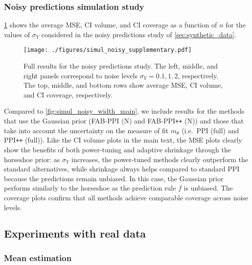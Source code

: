 \subsubsection{Noisy predictions simulation study}\label{app:simul_noisy_supplementary}
\cref{fig:simul_noisy_supplementary} shows the average MSE, CI volume, and CI coverage as a function of $n$ for the values of $\sigma_Y$ considered in the noisy predictions study of \cref{sec:synthetic_data}.
\begin{figure}[ht!]
    \centering
    \texttt{[image: ./figures/simul\_noisy\_supplementary.pdf]}
    \caption{Full results for the noisy predictions study. The left, middle, and right panels correspond to noise levels $\sigma_Y = 0.1, 1, 2$, respectively. The top, middle, and bottom rows show average MSE, CI volume, and CI coverage, respectively.}
    \label{fig:simul_noisy_supplementary}
\end{figure}
Compared to \cref{fig:simul_noisy_width_main}, we include results for the methods that use the Gaussian prior (FAB-PPI (N) and FAB-PPI\texttt{++} (N)) and those that take into account the uncertainty on the measure of fit $m_\theta$ (i.e.~PPI (full) and PPI\texttt{++} (full)). Like the CI volume plots in the main text, the MSE plots clearly show the benefits of both power-tuning and adaptive shrinkage through the horseshoe prior: as $\sigma_Y$ increases, the power-tuned methods clearly outperform the standard alternatives, while shrinkage always helps compared to standard PPI because the predictions remain unbiased. In this case, the Gaussian prior performs similarly to the horseshoe as the prediction rule $f$ is unbiased. The coverage plots confirm that all methods achieve comparable coverage across noise levels.

\subsection{Experiments with real data}\label{app:real_supplementary}
\subsubsection{Mean estimation}\label{app:mean_estimation}
